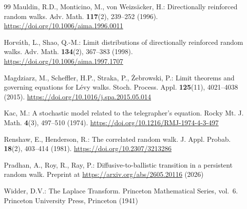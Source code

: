 \begin{thebibliography}{99}
Mauldin, R.D., Monticino, M., von Weizs\"acker, H.: Directionally reinforced
random walks. Adv. Math. \textbf{117}(2), 239--252 (1996).
\url{https://doi.org/10.1006/aima.1996.0011}

Horv\'ath, L., Shao, Q.-M.: Limit distributions of directionally reinforced
random walks. Adv. Math. \textbf{134}(2), 367--383 (1998).
\url{https://doi.org/10.1006/aima.1997.1707}

Magdziarz, M., Scheffler, H.P., Straka, P., \.Zebrowski, P.: Limit theorems
and governing equations for L\'evy walks. Stoch. Process. Appl.
\textbf{125}(11), 4021--4038 (2015).
\url{https://doi.org/10.1016/j.spa.2015.05.014}

Kac, M.: A stochastic model related to the telegrapher's equation. Rocky Mt.
J. Math. \textbf{4}(3), 497--510 (1974).
\url{https://doi.org/10.1216/RMJ-1974-4-3-497}

Renshaw, E., Henderson, R.: The correlated random walk. J. Appl. Probab.
\textbf{18}(2), 403--414 (1981). \url{https://doi.org/10.2307/3213286}

Pradhan, A., Roy, R., Ray, P.: Diffusive-to-ballistic transition in a
persistent random walk. Preprint at \url{https://arxiv.org/abs/2605.20116}
(2026)

Widder, D.V.: The Laplace Transform. Princeton Mathematical Series, vol.~6.
Princeton University Press, Princeton (1941)

\end{thebibliography}

